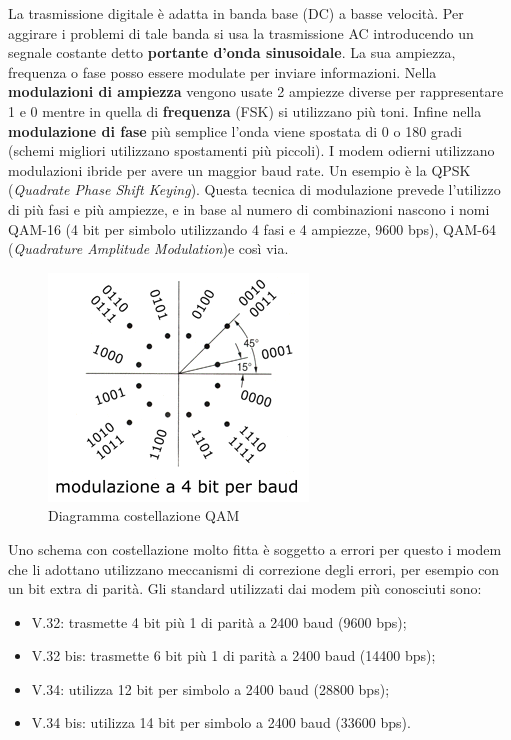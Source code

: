 La trasmissione digitale è adatta in banda base (DC) a basse velocità. Per aggirare i problemi di tale banda si usa la trasmissione AC introducendo un segnale costante detto \textbf{portante d'onda sinusoidale}. La sua ampiezza, frequenza o fase posso essere modulate per inviare informazioni. Nella \textbf{modulazioni di ampiezza} vengono usate 2 ampiezze diverse per rappresentare 1 e 0 mentre in quella di \textbf{frequenza} (FSK) si utilizzano più toni. Infine nella \textbf{modulazione di fase} più semplice l'onda viene spostata di 0 o 180 gradi (schemi migliori utilizzano spostamenti più piccoli). I modem odierni utilizzano modulazioni ibride per avere un maggior baud rate. Un esempio è la QPSK (\textit{Quadrate Phase Shift Keying}). Questa tecnica di modulazione prevede l'utilizzo di più fasi e più ampiezze, e in base al numero di combinazioni nascono i nomi QAM-16 (4 bit per simbolo utilizzando 4 fasi e 4 ampiezze, 9600 bps), QAM-64 (\textit{Quadrature Amplitude Modulation})e così via.

\begin{figure}[htbp]
\centering
\includegraphics[scale=1]{images/qam.png}
\caption{Diagramma costellazione QAM}
\end{figure}

Uno schema con costellazione molto fitta è soggetto a errori per questo i modem che li adottano utilizzano meccanismi di correzione degli errori, per esempio con un bit extra di parità.
Gli standard utilizzati dai modem più conosciuti sono:

\begin{itemize}

\item{V.32: trasmette 4 bit più 1 di parità a 2400 baud (9600 bps)};
\item{V.32 bis: trasmette 6 bit più 1 di parità a 2400 baud (14400 bps)};
\item{V.34: utilizza 12 bit per simbolo a 2400 baud (28800 bps)};
\item{V.34 bis: utilizza 14 bit per simbolo a 2400 baud (33600 bps)}.

\end{itemize}

